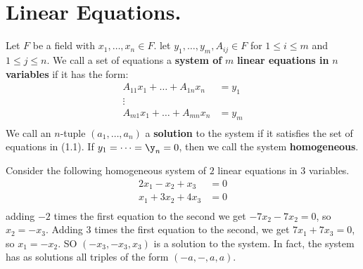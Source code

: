 
\section{Linear Equations.}
\label{section1}

\begin{definition}
    Let $F$ be a field with  $x_1, \dots, x_n \in F$. let $y_1, \dots, y_m, A_{ij} \in F$ for $1
    \leq i \leq m$ and  $1 \leq j \leq n$. We call a set of equations a  \textbf{system of} $m$
     \textbf{linear equations in} $n$ \textbf{variables} if it has the form:
        \begin{equation}
            \begin{align}
                A_{11}x_1+\dots+A_{1n}x_n &= y_1 \\
                        \vdots             \\
                A_{m1}x_1+\dots+A_{mn}x_n &= y_m \\
            \end{align}
        \end{equation} 
        We call an $n$-tuple  $(a_1, \dots, a_n)$ a \textbf{solution} to the system if it satisfies
        the set of equations in (1.1). If $y_1=\dots=\y_n=0$, then we call the system
        \textbf{homogeneous}.
\end{definition}

\begin{example}
    Consider the following homogeneous system of $2$ linear equations in  $3$ variables.
        \begin{equation*}
            \begin{align*}
                2x_1-x_2+x_3    &=  0 \\
                x_1+3x_2+4x_3   &=  0\\
            \end{align*}
        \end{equation*}
    adding $-2$ times the first equation to the second we get $-7x_2-7x_2=0$, so $x_2=-x_3$. Adding $3$ times the
    first equation to the second, we get $7x_1+7x_3=0$, so $x_1=-x_2$. SO $(-x_3,-x_3,x_3)$ is a
    solution to the system. In fact, the system has as solutions all triples of the form
    $(-a,-,a,a)$.
\end{example} 

